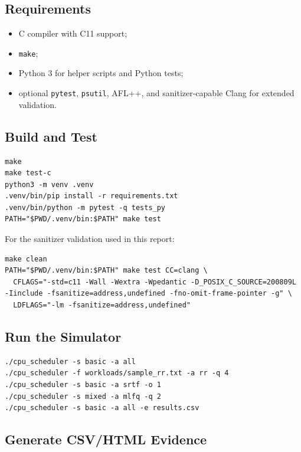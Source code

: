 \documentclass[11pt]{article}
\begin{document}
\subsection{Requirements}

\begin{itemize}
  \item C compiler with C11 support;
  \item \texttt{make};
  \item Python 3 for helper scripts and Python tests;
  \item optional \texttt{pytest}, \texttt{psutil}, AFL++, and sanitizer-capable
  Clang for extended validation.
\end{itemize}

\subsection{Build and Test}

\begin{lstlisting}[style=terminal]
make
make test-c
python3 -m venv .venv
.venv/bin/pip install -r requirements.txt
.venv/bin/python -m pytest -q tests_py
PATH="$PWD/.venv/bin:$PATH" make test
\end{lstlisting}

For the sanitizer validation used in this report:

\begin{lstlisting}[style=terminal]
make clean
PATH="$PWD/.venv/bin:$PATH" make test CC=clang \
  CFLAGS="-std=c11 -Wall -Wextra -Wpedantic -D_POSIX_C_SOURCE=200809L -Iinclude -fsanitize=address,undefined -fno-omit-frame-pointer -g" \
  LDFLAGS="-lm -fsanitize=address,undefined"
\end{lstlisting}

\subsection{Run the Simulator}

\begin{lstlisting}[style=terminal]
./cpu_scheduler -s basic -a all
./cpu_scheduler -f workloads/sample_rr.txt -a rr -q 4
./cpu_scheduler -s basic -a srtf -o 1
./cpu_scheduler -s mixed -a mlfq -q 2
./cpu_scheduler -s basic -a all -e results.csv
\end{lstlisting}

\subsection{Generate CSV/HTML Evidence}
\end{document}
